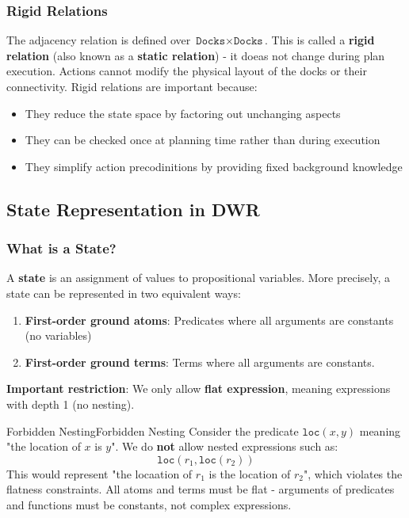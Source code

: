 \documentclass[a4paper]{article}
\theoremstyle{definition}
\begin{document}
\subsubsection{Rigid Relations}
The adjacency relation is defined over \( \texttt{Docks} \times \texttt{Docks} \). This is called a \textbf{rigid relation} (also known 
as a \textbf{static relation}) - it doeas not change during plan execution. Actions cannot modify the physical layout of the docks or their connectivity.
\vspace{1em}
\noindent
\newline
Rigid relations are important because:
\begin{itemize}
    \item They reduce the state space by factoring out unchanging aspects 
    \item They can be checked once at planning time rather than during execution 
    \item They simplify action precodinitions by providing fixed background knowledge
\end{itemize}
\subsection{State Representation in DWR}
\subsubsection{What is a State?}
A \textbf{state} is an assignment of values to propositional variables. More precisely, a state can be represented in two equivalent ways:
\begin{enumerate}
    \item \textbf{First-order ground atoms}: Predicates where all arguments are constants (no variables)
    \item \textbf{First-order ground terms}: Terms where all arguments are constants.
\end{enumerate}
\textbf{Important restriction}: We only allow \textbf{flat expression}, meaning expressions with depth 1 (no nesting).
\vspace{1em}
\noindent
\newline
\begin{example}{Forbidden Nesting}{Forbidden Nesting}
Consider the predicate \( \texttt{loc}(x,y) \) meaning "the location of \( x \) is \( y \)". We do \textbf{not} allow 
nested expressions such as:
\[
  \texttt{loc}(r_1,\texttt{loc}(r_2))
\]
This would represent "the locaation of \( r_1 \) is the location of \( r_2 \)", which violates the flatness constraints.
\vspace{1em}
\noindent
\newline
All atoms and terms must be flat - arguments of predicates and functions must be constants, not complex expressions.
\end{example}
\end{document}
